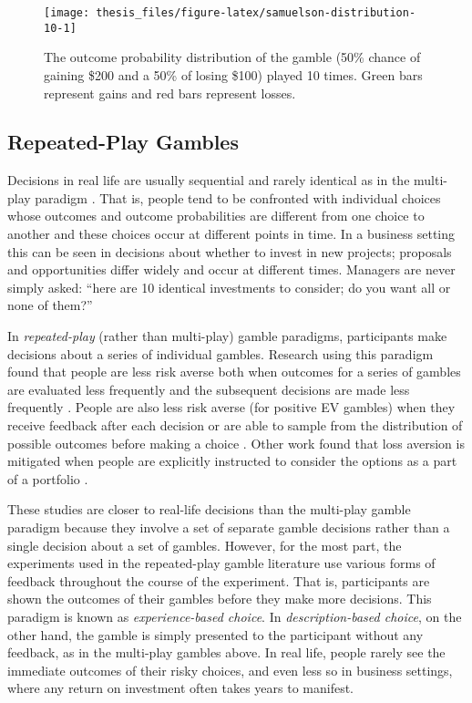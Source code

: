 \documentclass[a4paper, nobind]{templates/ociamthesis}
\theoremstyle{definition}
\theoremstyle{definition}
\theoremstyle{definition}
\theoremstyle{definition}
\theoremstyle{remark}
\begin{document}
\begin{figure}
\texttt{[image: thesis\_files/figure-latex/samuelson-distribution-10-1]} \caption{The outcome probability distribution of the \textcite{samuelson1963} gamble (50\% chance of gaining \$200 and a 50\% of losing \$100) played 10 times. Green bars represent gains and red bars represent losses.}\label{fig:samuelson-distribution-10}
\end{figure}

\subsection{Repeated-Play Gambles}

Decisions in real life are usually sequential and rarely identical as in the
multi-play paradigm \autocite[cf.][]{barron2003}. That is, people tend to be confronted
with individual choices whose outcomes and outcome probabilities are different
from one choice to another and these choices occur at different points in time.
In a business setting this can be seen in decisions about whether to invest in
new projects; proposals and opportunities differ widely and occur at different
times. Managers are never simply asked: ``here are 10 identical investments to
consider; do you want all or none of them?''

In \emph{repeated-play} (rather than multi-play) gamble paradigms, participants make
decisions about a series of individual gambles. Research using this paradigm
found that people are less risk averse both when outcomes for a series of
gambles are evaluated less frequently and the subsequent decisions are made less
frequently \autocite{gneezy1997,thaler1997,bellemare2005,beshears2016}. People are
also less risk averse (for positive EV gambles) when they receive feedback after
each decision or are able to sample from the distribution of possible outcomes
before making a choice \autocite{camilleri2011,camilleri2013,barron2003,wulff2018,ludvig2011,hertwig2004,jessup2008}. Other work found that loss aversion is
mitigated when people are explicitly instructed to consider the options as a
part of a portfolio \autocite{sokolhessner2009,sokolhessner2012}.

These studies are closer to real-life decisions than the multi-play gamble
paradigm because they involve a set of separate gamble decisions rather than a
single decision about a set of gambles. However, for the most part, the
experiments used in the repeated-play gamble literature use various forms of
feedback throughout the course of the experiment. That is, participants are
shown the outcomes of their gambles before they make more decisions. This
paradigm is known as \emph{experience-based choice}. In \emph{description-based choice},
on the other hand, the gamble is simply presented to the participant without any
feedback, as in the multi-play gambles above. In real life, people rarely see
the immediate outcomes of their risky choices, and even less so in business
settings, where any return on investment often takes years to manifest.
\end{document}

